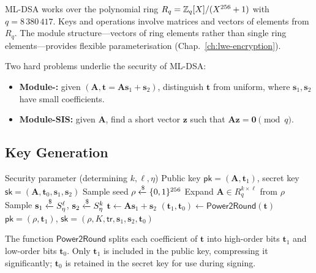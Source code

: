 ML-DSA works over the polynomial ring $R_q = \mathbb{Z}_q[X]/(X^{256}+1)$ with $q = 8\,380\,417$.  Keys and operations involve matrices and vectors of elements from $R_q$.  The module structure---vectors of ring elements rather than single ring elements---provides flexible parameterisation (Chap.~\ref{ch:lwe-encryption}).

Two hard problems underlie the security of ML-DSA:
\begin{itemize}
\item \textbf{Module-\lwe{}:} given $(\mathbf{A}, \mathbf{t} = \mathbf{A}\mathbf{s}_1 + \mathbf{s}_2)$, distinguish $\mathbf{t}$ from uniform, where $\mathbf{s}_1, \mathbf{s}_2$ have small coefficients.
\item \textbf{Module-SIS:} given $\mathbf{A}$, find a short vector $\mathbf{z}$ such that $\mathbf{A}\mathbf{z} = \mathbf{0} \pmod{q}$.
\end{itemize}

\subsection{Key Generation}
\label{subsec:ml-dsa-keygen}

\begin{algorithm}[t]
\caption{ML-DSA $\KeyGen$}
\label{alg:ml-dsa-keygen}
\begin{algorithmic}[1]
\Require Security parameter (determining $k, \ell, \eta$)
\Ensure Public key $\mathsf{pk} = (\mathbf{A}, \mathbf{t}_1)$, secret key $\mathsf{sk} = (\mathbf{A}, \mathbf{t}_0, \mathbf{s}_1, \mathbf{s}_2)$
\State Sample seed $\rho \getsr \{0,1\}^{256}$
\State Expand $\mathbf{A} \in R_q^{k \times \ell}$ from $\rho$ 
\State Sample $\mathbf{s}_1 \getsr S_\eta^{\ell}$, $\mathbf{s}_2 \getsr S_\eta^{k}$ 
\State $\mathbf{t} \gets \mathbf{A}\mathbf{s}_1 + \mathbf{s}_2$
\State $(\mathbf{t}_1, \mathbf{t}_0) \gets \mathsf{Power2Round}(\mathbf{t})$ 
\State \Return $\mathsf{pk} = (\rho, \mathbf{t}_1)$, $\mathsf{sk} = (\rho, K, \mathsf{tr}, \mathbf{s}_1, \mathbf{s}_2, \mathbf{t}_0)$
\end{algorithmic}
\end{algorithm}

The function $\mathsf{Power2Round}$ splits each coefficient of $\mathbf{t}$ into high-order bits $\mathbf{t}_1$ and low-order bits $\mathbf{t}_0$.  Only $\mathbf{t}_1$ is included in the public key, compressing it significantly; $\mathbf{t}_0$ is retained in the secret key for use during signing.

